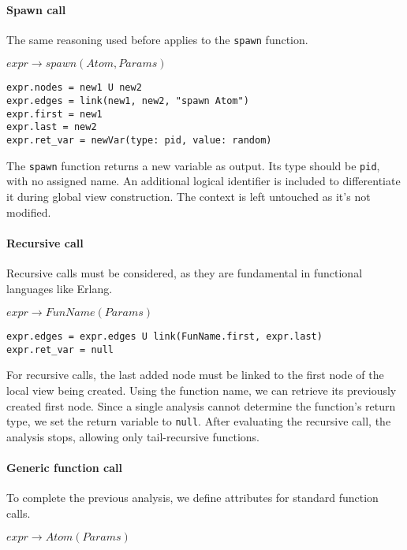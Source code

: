 \paragraph{Spawn call}  
The same reasoning used before applies to the \texttt{spawn} function.  

\bigskip

\noindent $expr \to spawn(Atom, Params)$

\begin{verbatim}
expr.nodes = new1 U new2
expr.edges = link(new1, new2, "spawn Atom")
expr.first = new1
expr.last = new2
expr.ret_var = newVar(type: pid, value: random) 
\end{verbatim}

The \texttt{spawn} function returns a new variable as output.  
Its type should be \texttt{pid}, with no assigned name.  
An additional logical identifier is included to differentiate  
it during global view construction. The context is left untouched
as it's not modified.

\paragraph{Recursive call}  
Recursive calls must be considered, as they are fundamental  
in functional languages like Erlang.  

\bigskip

\noindent $expr \to FunName(Params)$

\begin{verbatim}
expr.edges = expr.edges U link(FunName.first, expr.last)
expr.ret_var = null
\end{verbatim}

For recursive calls, the last added node must be linked to the first  
node of the local view being created. Using the function name,  
we can retrieve its previously created first node.  
Since a single analysis cannot determine the function's return type,  
we set the return variable to \texttt{null}. After evaluating the  
recursive call, the analysis stops, allowing only tail-recursive  
functions.  

\paragraph{Generic function call}  
To complete the previous analysis, we define attributes for  
standard function calls.  

\bigskip

\noindent $expr \to Atom(Params)$

